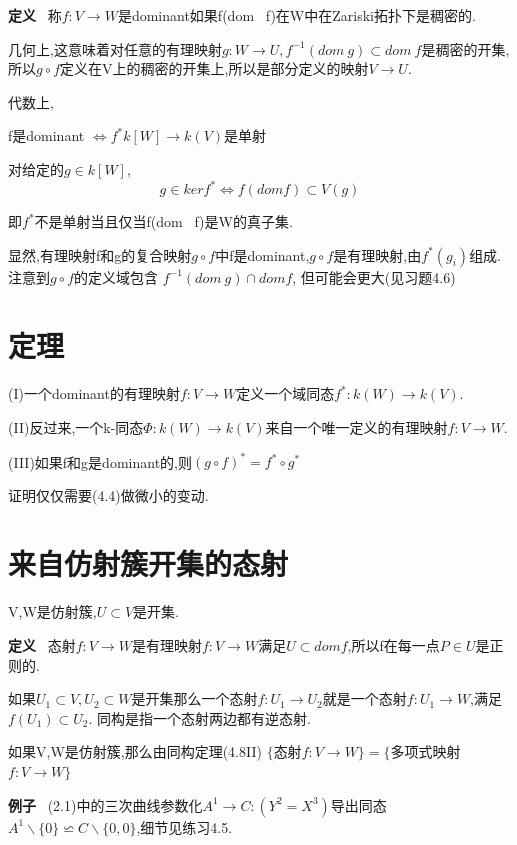 \documentclass[UTF8]{book}
\begin{document}
		\textbf{定义} \ 称$f:V \rightarrow W$是dominant如果f(dom \ f)在W中在Zariski拓扑下是稠密的.

		几何上,这意味着对任意的有理映射$g:W\rightarrow U,  f^{-1}(dom \ g)\subset dom \ f$是稠密的开集,所以$g\circ f$定义在V上的稠密的开集上,所以是部分定义的映射$V\rightarrow U$.

		代数上,

		\center  f是dominant $\iff f^{*}k[W]\rightarrow k(V)$是单射

		\justifying
		对给定的$g\in k[W]$,
		\begin{equation*}
		g\in ker f^{*} \iff f(dom f)\subset V(g)
		\end{equation*}

		即$f^{*}$不是单射当且仅当f(dom \ f)是W的真子集.

		显然,有理映射f和g的复合映射$g\circ f$中f是dominant,$g\circ f$是有理映射,由$f^{*}(g_{i})$组成.注意到$g\circ f$的定义域包含 $f^{-1}(dom \ g)\cap dom f$, 但可能会更大(见习题4.6)
	\section{定理}
		(I)一个dominant的有理映射$f:V\rightarrow W$定义一个域同态$f^{*}:k(W)\rightarrow k(V)$.

		(II)反过来,一个k-同态$\Phi: k(W)\rightarrow k(V)$来自一个唯一定义的有理映射$f:V\rightarrow W$.

		(III)如果f和g是dominant的,则$(g\circ f)^{*}=f^{*}\circ g^{*}$

		证明仅仅需要(4.4)做微小的变动.

	\section{来自仿射簇开集的态射}
		V,W是仿射簇,$U\subset V$是开集.

		\textbf{定义} \ 态射$f:V\rightarrow W$是有理映射$f:V\rightarrow W$满足$U\subset dom f$,所以f在每一点$P\in U$是正则的.

		如果$U_{1}\subset V,U_{2}\subset W$是开集那么一个态射$f:U_{1}\rightarrow U_{2}$就是一个态射$f:U_{1}\rightarrow W$,满足$f(U_{1})\subset U_{2}$. 同构是指一个态射两边都有逆态射.

		如果V,W是仿射簇,那么由同构定理(4.8II)
		\center  $\{$态射$f:V\rightarrow W\}=\{$多项式映射$f:V\rightarrow W\}$


		\justifying
		\textbf{例子} \ (2.1)中的三次曲线参数化$A^{1} \rightarrow C:(Y^{2}=X^{3}) $导出同态$A^{1}\backslash \{0\}\backsimeq C\backslash \{0,0\}$,细节见练习4.5.
\end{document}
